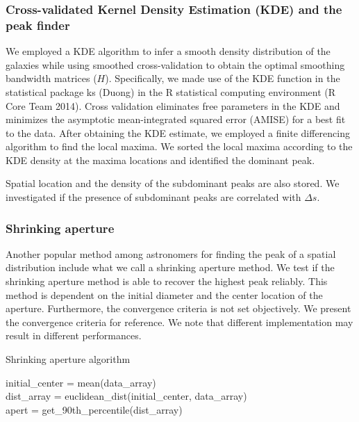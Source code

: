 \documentclass[letterpaper,useAMS,usenatbib]{mn2e}
\begin{document}
\subsubsection{Cross-validated Kernel Density Estimation (KDE) and the peak finder} 
We employed a KDE algorithm to infer a smooth density distribution of the
galaxies while using smoothed cross-validation to obtain the optimal smoothing
bandwidth matrices ($H$). Specifically, we made use of the KDE function in
the statistical package ks (Duong) in the R statistical computing environment (R Core Team 2014).
Cross validation eliminates free parameters in the KDE and minimizes
the asymptotic mean-integrated squared error (AMISE) for a best fit to the
data.
After obtaining the KDE estimate, we employed a finite differencing algorithm
to find the local maxima. We sorted the local maxima according to the KDE
density at the maxima locations and identified the dominant peak. 

Spatial location and the density of the subdominant peaks are also stored.
We investigated if the presence of subdominant peaks are correlated with
$\Delta s$. 

\subsubsection{Shrinking aperture}
Another popular method among astronomers for finding the peak of a spatial
distribution include what we call a shrinking aperture method.
We test if the shrinking aperture method is able to recover the highest peak reliably.
This method is dependent on the initial diameter and the center location of the aperture.
Furthermore, the convergence criteria is not set objectively. We present the
convergence criteria for reference. We note that different implementation may result in
different performances.
\begin{algorithm}
	\caption{Shrinking aperture algorithm}
	 \hrulefill

	initial_center = mean(data\_array)\\
 	dist\_array = euclidean_dist(initial_center, data_array)\\
 	apert = get\_90th\_percentile(dist\_array)\\ 
	   \hrulefill
 \end{algorithm}
\end{document}

